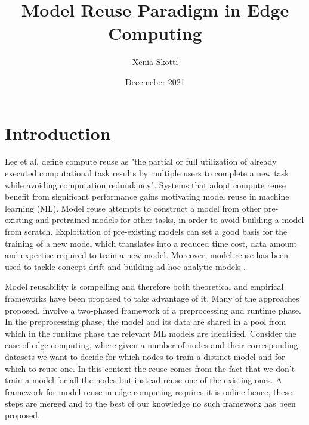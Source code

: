\documentclass{mprop}
\begin{document}
\title{Model Reuse Paradigm in Edge Computing}
\author{Xenia Skotti}
\date{Decemeber 2021}
\maketitle

\tableofcontents
\newpage

\section{Introduction}\label{intro}

Lee et al. \cite{ComputeReuse} define compute reuse as "the partial or full utilization of already executed computational task results by multiple users to complete a new task while avoiding computation redundancy".  Systems that adopt compute reuse benefit from significant performance gains motivating model reuse in machine learning (ML). Model reuse \cite{Learnware} attempts to construct a model from other pre-existing and pretrained models for other tasks, in order to avoid building a model from scratch. Exploitation of pre-existing models can set a good basis for the training of a new model which translates into a reduced time cost, data amount and expertise required to train a new model. Moreover, model reuse has been used to tackle concept drift \cite{ConceptDrift} and building ad-hoc analytic models \cite{MaterializationReuse}.

Model reusability is compelling and therefore both theoretical \cite{Learnware} and empirical \cite{MaterializationReuse}\cite{KernelMMD}  frameworks have been proposed to take advantage of it. Many of the approaches proposed, involve a two-phased framework of a preprocessing and runtime phase. In the preprocessing phase, the model and its data are shared in a pool from which in the runtime phase the relevant ML models are identified. Consider the case of edge computing, where given a number of nodes and their corresponding datasets we want to decide for which nodes to train a distinct model and for which to reuse one. In this context the reuse comes from the fact that we don’t train a model for all the nodes but instead reuse one of the existing ones. A framework for model reuse in edge computing requires it is online hence, these steps are merged and to the best of our knowledge no such framework has been proposed. 
\end{document}
